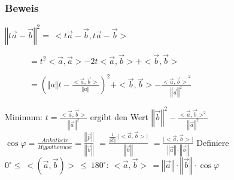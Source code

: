 \subsubsection{Beweis}
$\left\Vert t\vec{a} - \vec{b}\right\Vert^{2} = \, <t\vec{a} - \vec{b}, t\vec{a} - \vec{b}>$
\begin{description}
 \item [\tab] $ = t^{2}<\vec{a}, \vec{a}> - 2t<\vec{a}, \vec{b}> + <\vec{b}, \vec{b}>$
 \item [\tab] $ = \left( \Vert a \Vert t - \frac{<\vec{a}, \vec{b}>}{\Vert a \Vert}\right)^{2} + <\vec{b}, \vec{b}> - \frac{<{\vec{a}, \vec{b}>}^2}{\left\Vert\vec{a}\right\Vert^{2}}$
\end{description}
Minimum: $ t = \frac{<\vec{a}, \vec{b}>}{\left\Vert\vec{a}\right\Vert^2}$
ergibt den Wert $\left\Vert\vec{b}\right\Vert^2 - \frac{<\vec{a}, \vec{b}>^2}{\left\Vert\vec{a}\right\Vert^2}$\\
$\cos\varphi = \frac{Ankathete}{Hypothenuse} = \frac{\left\Vert\vec{p}\right\Vert}{\left\Vert\vec{b}\right\Vert}$
$= \frac{\frac{1}{\Vert\vec{a}\Vert}\cdot\vert<\vec{a}, \vec{b}>\vert}{\left\Vert\vec{b}\right\Vert}$
$= \frac{\vert<\vec{a}, \vec{b}>\vert}{\left\Vert\vec{a}\right\Vert\cdot\left\Vert\vec{b}\right\Vert}$
Definiere $0^{\circ}\leq\, <(\vec{a}, \vec{b})>\, \leq\,  180^{\circ} :\, <\vec{a}, \vec{b}>\, = \left\Vert\vec{a}\right\Vert\cdot\left\Vert\vec{b}\right\Vert\cdot\cos\varphi$
%
%
%